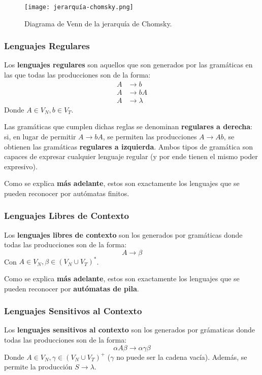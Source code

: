 \begin{figure}[H]
    \centering
    \texttt{[image: jerarquía-chomsky.png]}
    \caption*{Diagrama de Venn de la jerarquía de Chomsky.}
\end{figure}

\subsubsection{Lenguajes Regulares}

Los \textbf{lenguajes regulares} son aquellos que son generados por las gramáticas en las que todas las producciones son de la forma:
$$
\begin{aligned}
    A & \to b \\
    A & \to b A \\
    A & \to \lambda
\end{aligned}
$$
Donde $A \in V_N, b \in V_T$.

Las gramáticas que cumplen dichas reglas se denominan \textbf{regulares a derecha}: si, en lugar de permitir $A \to b A$, se permiten las producciones $A \to A b$, se obtienen las gramáticas \textbf{regulares a izquierda}. Ambos tipos de gramática son capaces de expresar cualquier lenguaje regular (y por ende tienen el mismo poder expresivo).

Como se explica \textbf{más adelante}, estos son exactamente los lenguajes que se pueden reconocer por autómatas finitos.

\subsubsection{Lenguajes Libres de Contexto}

Los \textbf{lenguajes libres de contexto} son los generados por gramáticas donde todas las producciones son de la forma:
$$A \to \beta$$
Con $A \in V_N, \beta \in (V_N \cup V_T)^*$.

Como se explica \textbf{más adelante}, estos son exactamente los lenguajes que se pueden reconocer por \textbf{autómatas de pila}.

\subsubsection{Lenguajes Sensitivos al Contexto}

Los \textbf{lenguajes sensitivos al contexto} son los generados por grámaticas donde todas las producciones son de la forma:
$$\alpha A \beta \to \alpha \gamma \beta$$
Donde $A \in V_N, \gamma \in (V_N \cup V_T)^+$ ($\gamma$ no puede ser la cadena vacía). Además, se permite la producción $S \to \lambda$.

